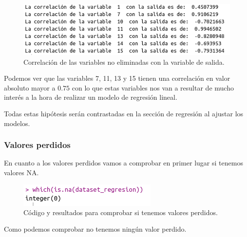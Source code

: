 \documentclass[12pt,a4paper]{article}
\begin{document}
\begin{figure}[H]
	\centering
	\includegraphics[scale=0.6]{./Imagenes/correlacion_variable_salida1.png}
	\caption{Correlación de las variables no eliminadas con la variable de salida.}
\end{figure}

Podemos ver que las variables 7, 11, 13 y 15 tienen una correlación en valor absoluto mayor a $0.75$ con lo que estas variables nos van a resultar de mucho interés a la hora de realizar un modelo de regresión lineal.

Todas estas hipótesis serán contrastadas en la sección de regresión al ajustar los modelos.

\subsubsection{Valores perdidos}

En cuanto a los valores perdidos vamos a comprobar en primer lugar si tenemos valores NA.

\begin{figure}[H]
	\centering
	\includegraphics[scale=0.6]{./Imagenes/valores_perdidos.png}
	\caption{Código y resultados para comprobar si tenemos valores perdidos.}
\end{figure}

Como podemos comprobar no tenemos ningún valor perdido.
\end{document}

